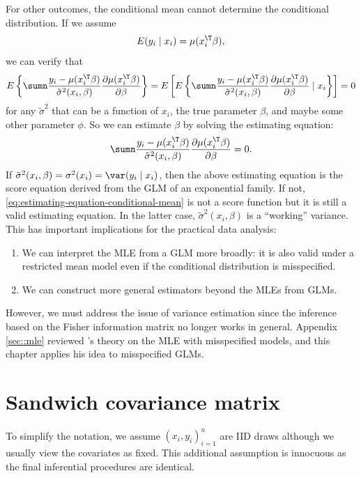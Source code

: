 For other outcomes, the conditional mean cannot determine the conditional
distribution. If we assume 
\[
E(y_{i}\mid x_{i})=\mu(x_{i}^{\T}\beta),
\]
we can verify that 
\[
E\left\{ \sumn\frac{y_{i}-\mu(x_{i}^{\T}\beta)}{\tilde{\sigma}^{2} (x_i, \beta)}\frac{\partial\mu(x_{i}^{\T}\beta)}{\partial\beta}\right\} =E\left[E\left\{ \sumn\frac{y_{i}-\mu(x_{i}^{\T}\beta)}{ \tilde{\sigma}^{2} (x_i, \beta) }\frac{\partial\mu(x_{i}^{\T}\beta)}{\partial\beta}\mid x_i \right\} \right]=0
\]
for any $\tilde{\sigma}^{2}$ that can be a function of $x_{i}$, the true parameter $\beta$, and maybe some other parameter $\phi$. So we can estimate $\beta$ by solving the estimating equation:
\begin{equation}
\sumn\frac{y_{i}-\mu(x_{i}^{\T}\beta)}{ \tilde{\sigma}^{2} (x_i, \beta)  }\frac{\partial\mu(x_{i}^{\T}\beta)}{\partial\beta}=0. \label{eq:estimating-equation-conditional-mean}
\end{equation}
If $\tilde{\sigma}^{2} (x_i, \beta) = \sigma^2(x_i) =\var(y_{i}\mid x_{i})$,
then the above estimating equation is the score equation derived from
the GLM of an exponential family. If not, \eqref{eq:estimating-equation-conditional-mean} is not a score function but it is still a valid estimating equation.
In the latter case, $ \tilde{\sigma}^{2} (x_i, \beta)  $ is a ``working''
variance. This has important implications for the practical data analysis:
\begin{enumerate}[label=(I\arabic*), ref=I\arabic*]
\item
We can interpret the MLE from a GLM more broadly: it is also
valid under a restricted mean model even if the conditional distribution
is misspecified.
\item
We can construct more general estimators
beyond the MLEs from GLMs.
\end{enumerate}
However, we must address the issue of variance
estimation since the inference based on the Fisher information matrix no longer
works in general. Appendix \ref{sec::mle} reviewed \citet{huber::1967}'s theory on the MLE with misspecified models, and this chapter applies his idea to misspecified GLMs.





\section{Sandwich covariance matrix}
\label{sec::rmm-sandwich-covariance}
 
 To simplify the notation, we assume $(x_i,y_i)_{i=1}^n$ are IID draws although we usually view the covariates as fixed. This additional assumption is innocuous as the final inferential procedures are identical. 
 
